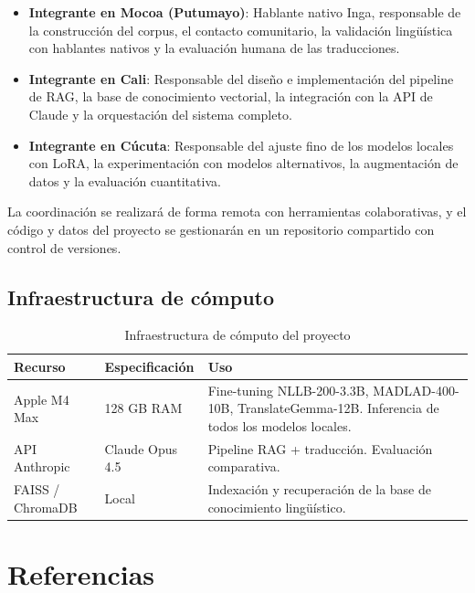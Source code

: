 \documentclass[12pt,a4paper]{article}
\begin{document}
\begin{itemize}
    \item \textbf{Integrante en Mocoa (Putumayo)}: Hablante nativo Inga, responsable de la construcción del corpus, el contacto comunitario, la validación lingüística con hablantes nativos y la evaluación humana de las traducciones.

    \item \textbf{Integrante en Cali}: Responsable del diseño e implementación del pipeline de RAG, la base de conocimiento vectorial, la integración con la API de Claude y la orquestación del sistema completo.

    \item \textbf{Integrante en Cúcuta}: Responsable del ajuste fino de los modelos locales con LoRA, la experimentación con modelos alternativos, la augmentación de datos y la evaluación cuantitativa.
\end{itemize}

La coordinación se realizará de forma remota con herramientas colaborativas, y el código y datos del proyecto se gestionarán en un repositorio compartido con control de versiones.

\subsection{Infraestructura de cómputo}

\begin{table}[h]
\centering
\begin{tabular}{@{}p{4cm}p{4cm}p{6cm}@{}}
\toprule
\textbf{Recurso} & \textbf{Especificación} & \textbf{Uso} \\
\midrule
Apple M4 Max & 128 GB RAM & Fine-tuning NLLB-200-3.3B, MADLAD-400-10B, TranslateGemma-12B. Inferencia de todos los modelos locales. \\
API Anthropic & Claude Opus 4.5 & Pipeline RAG + traducción. Evaluación comparativa. \\
FAISS / ChromaDB & Local & Indexación y recuperación de la base de conocimiento lingüístico. \\
\bottomrule
\end{tabular}
\caption{Infraestructura de cómputo del proyecto}
\end{table}

\section*{Referencias}
\end{document}

